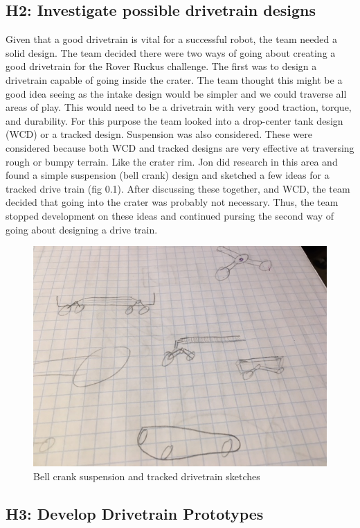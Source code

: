 \documentclass{article}
\begin{document}
\subsection{H2: Investigate possible drivetrain designs}

Given that a good drivetrain is vital for a successful robot, the team needed a solid design. The team decided there were two ways of going about creating a good drivetrain for the Rover Ruckus challenge. The first was to design a drivetrain capable of going inside the crater. The team thought this might be a good idea seeing as the intake design would be simpler and we could traverse all areas of play. This would need to be a drivetrain with very good traction, torque, and durability. For this purpose the team looked into a drop-center tank design (WCD) or a tracked design. Suspension was also considered. These were considered because both WCD and tracked designs are very effective at traversing rough or bumpy terrain. Like the crater rim. Jon did research in this area and found a simple suspension (bell crank) design and sketched a few ideas for a tracked drive train (fig 0.1). After discussing these together, and WCD, the team decided that going into the crater was probably not necessary. Thus, the team stopped development on these ideas and continued pursing the second way of going about designing a drive train.



\begin{figure}
    \centering
    \includegraphics[width=.6\textwidth]{02_09-10/images/IMG_0256.JPG}
    \caption{Bell crank suspension and tracked drivetrain sketches}
    \label{fig:drivetrain sketches}
\end{figure}



\subsection{H3: Develop Drivetrain Prototypes}
\end{document}
